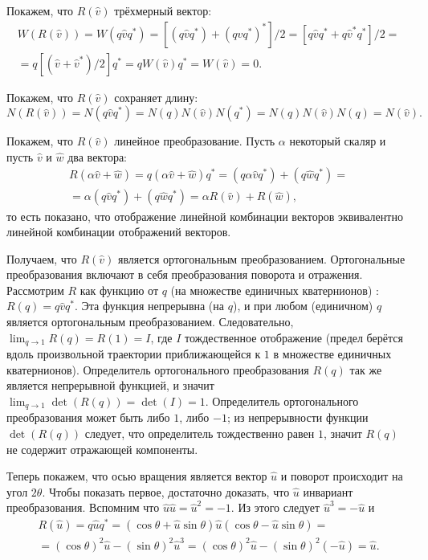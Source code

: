 \documentclass[draft]{article}
\begin{document}
Покажем, что $R(\widehat{v})$ трёхмерный вектор:
\begin{multline*}
W(R(\widehat{v})) = W(q\widehat{v}q^*) = [(q\widehat{v}q^*) + (q\widehat{v}q^*)^*]/2 = [q\widehat{v}q^* + q\widehat{v}^*q^*]/2 = {} \\
{} = q[(\widehat{v} + \widehat{v}^*)/2]q^* = q W(\widehat{v}) q^* = W(\widehat{v}) = 0 .
\end{multline*}

Покажем, что $R(\widehat{v})$ сохраняет длину:
\[ N(R(\widehat{v})) = N(q\widehat{v}q^*) = N(q) N(\widehat{v}) N(q^*) = N(q) N(\widehat{v}) N(q) = N(\widehat{v}) . \]

Покажем, что $R(\widehat{v})$ линейное преобразование. Пусть $\alpha$ некоторый скаляр и пусть $\widehat{v}$ и $\widehat{w}$ два вектора:
\begin{multline*}
R(\alpha \widehat{v} + \widehat{w}) = q(\alpha \widehat{v} + \widehat{w})q^* = (q \alpha \widehat{v} q^*) + (q \widehat{w} q^*) = {} \\ 
{} = \alpha (q \widehat{v} q^*) + (q \widehat{w} q^*) = \alpha R(\widehat{v}) + R(\widehat{w}) , 
\end{multline*}
то есть показано, что отображение линейной комбинации векторов эквивалентно линейной комбинации отображений векторов.

Получаем, что $R(\widehat{v})$ является ортогональным преобразованием. Ортогональные преобразования включают в себя  преобразования поворота и отражения.
Рассмотрим $R$ как функцию от $q$ (на множестве единичных кватернионов) : $R(q) = q\widehat{v}q^*$. Эта функция непрерывна (на $q$), и при любом (единичном) $q$ является ортогональным преобразованием. Следовательно, $\lim_{q \rightarrow 1}{R(q)} = R(1) = I$, где $I$ тождественное отображение (предел берётся вдоль произвольной траектории приближающейся к $1$ в множестве единичных кватернионов). Определитель ортогонального преобразования $R(q)$ так же является непрерывной функцией, и значит $\lim_{q\rightarrow 1}{\det(R(q))} = \det(I) = 1$. Определитель ортогонального преобразования может быть либо $1$, либо $-1$; из непрерывности функции $\det(R(q))$ следует, что определитель тождественно равен $1$, значит $R(q)$ не содержит отражающей компоненты.

Теперь покажем, что осью вращения является вектор $\widehat{u}$ и поворот происходит на угол $2\theta$. Чтобы показать первое, достаточно доказать, что $\widehat{u}$ инвариант преобразования. Вспомним что $\widehat{u}\widehat{u} = {\widehat{u}}^2 = -1$. Из этого следует $\widehat{u}^3 = - \widehat{u}$ и 
\begin{multline*}
R(\widehat{u}) = q \widehat{u} q^* = (\cos \theta + \widehat{u} \sin \theta) \widehat{u} (\cos \theta - \widehat{u} \sin \theta) = {} \\
{} = (\cos \theta)^2 \widehat{u} - (\sin \theta)^2 \widehat{u}^3 =  (\cos \theta)^2\widehat{u} - (\sin \theta)^2 (-\widehat{u}) = \widehat{u} .
\end{multline*}
\end{document}
